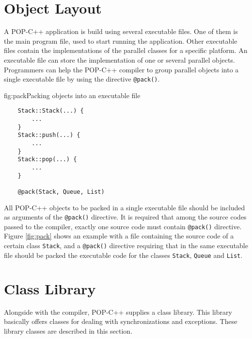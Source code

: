 

\section{Object Layout} \label{sec:pack}

A POP-C++ application is build using several executable files. One of
them is the main program file, used to start running the application.
Other executable files contain the implementations of the parallel
classes for a specific platform. An executable file can store the
implementation of one or several parallel objects. Programmers can help
the POP-C++ compiler to group parallel objects into a single executable
file by using the directive \texttt{@pack()}.

\begin{figura}{fig:pack}{Packing objects into an executable file}%
\vspace{-4mm}%
\begin{verbatim}
    Stack::Stack(...) {
        ...
    }
    Stack::push(...) {
        ...
    }
    Stack::pop(...) {
        ...
    }

    @pack(Stack, Queue, List)
\end{verbatim}
\end{figura}

All POP-C++ objects to be packed in a single executable file should be
included as arguments of the \texttt{@pack()} directive. It is required
that among the source codes passed to the compiler, exactly one source
code must contain \texttt{@pack()} directive. Figure \ref{fig:pack}
shows an example with a file containing the source code of a certain
class \texttt{Stack}, and a \texttt{@pack()} directive requiring that in
the same executable file should be packed the executable code for the
classes \texttt{Stack}, \texttt{Queue} and \texttt{List}.



\section{Class Library}


Alongside with the compiler, POP-C++ supplies a class library. This
library basically offers classes for dealing with synchronizations and
exceptions. These library classes are described in this section.


